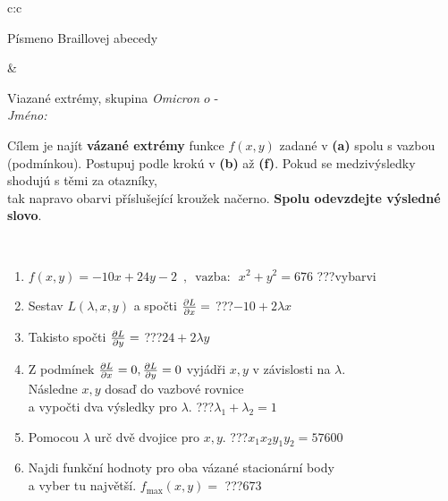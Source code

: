 \documentclass[10pt]{report}
\newcommand\omicron{o}
\begin{document}
\begin{tabular}{c:c}
\begin{minipage}[c][104.5mm][t]{0.5\linewidth}
\begin{center}
\begin{minipage}{0.20\linewidth}
\begin{center}
{\small Písmeno Braillovej abecedy}
\end{center}
\end{minipage}
\end{center}
\end{minipage}
&
\begin{minipage}[c][104.5mm][t]{0.5\linewidth}
\begin{center}
\vspace{7mm}
{\huge Viazané extrémy, skupina \textit{Omicron $\omicron$} -}\\[5mm]
\textit{Jméno:}\phantom{xxxxxxxxxxxxxxxxxxxxxxxxxxxxxxxxxxxxxxxxxxxxxxxxxxxxxxxxxxxxxxxxx}\\[5mm]
\begin{minipage}{0.95\linewidth}
\begin{center}
Cílem je najít \textbf{vázané extrémy} funkce $f(x,y)$ zadané v \textbf{(a)} spolu s vazbou (podmínkou). Postupuj podle krokú v \textbf{(b)} až \textbf{(f)}. Pokud se medzivýsledky shodujú s těmi za otazníky,\\tak napravo obarvi příslušející kroužek načerno. \textbf{Spolu odevzdejte výsledné slovo}.
\end{center}
\end{minipage}
\\[1mm]
\begin{minipage}{0.79\linewidth}
\begin{center}
\begin{varwidth}{\linewidth}
\begin{enumerate}
\normalsize
\item $f(x,y)=-10x+24y-2 \enspace , \enspace \mathrm{vazba:} \enspace x^2+y^2=676$\quad \dotfill\; ???\;\dotfill \quad vybarvi
\item Sestav $L(\lambda,x,y)$ a spočti $\pdv{L}{x}=$\quad \dotfill\; ???\;\dotfill \quad $-10+2\lambda x$
\item Takisto spočti $\pdv{L}{y}=$\quad \dotfill\; ???\;\dotfill \quad $24+2\lambda y$
\item Z podmínek $\pdv{L}{x}=0 , \pdv{L}{y}=0$ vyjádři $x,y$ v závislosti na $\lambda$.\\ \phantom{xxxxxx}Následne $x,y$ dosaď do vazbové rovnice\\ \phantom{xxxxxx}a vypočti dva výsledky pro $\lambda$.\quad \dotfill\; ???\;\dotfill \quad $\lambda_1+\lambda_2=1$
\item Pomocou $\lambda$ urč dvě dvojice pro $x,y$.\quad \dotfill\; ???\;\dotfill \quad $x_1 x_2 y_1 y_2=57600$
\item Najdi funkční hodnoty pro oba vázané stacionární body\\ \phantom{xxxxxx}a vyber tu najvětší. $f_{\text{max}}(x,y)=$\quad \dotfill\; ???\;\dotfill \quad $673$

\end{enumerate}
\end{varwidth}
\end{center}
\end{minipage}
\end{center}
\end{minipage}
\end{tabular}
\end{document}
